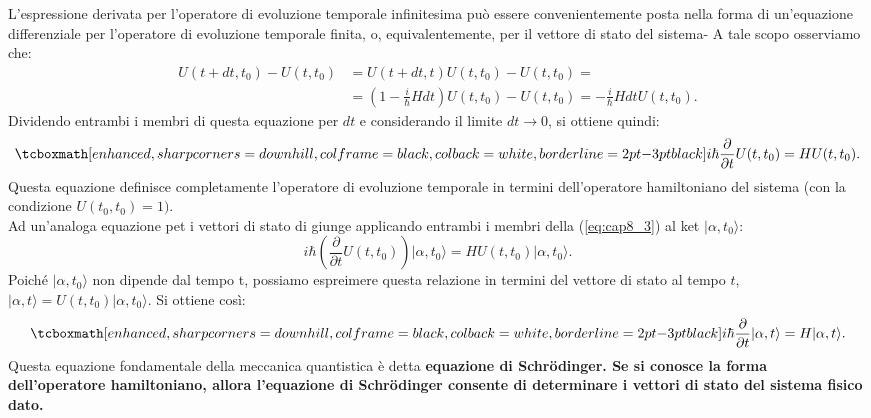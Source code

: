 L'espressione derivata per l'operatore di evoluzione temporale infinitesima può essere convenientemente posta nella forma di un'equazione differenziale per l'operatore di evoluzione temporale finita, o, equivalentemente, per il vettore di stato del sistema- A tale scopo osserviamo che:
	\begin{align}
		U(t+dt,t_0)-U(t,t_0)&=  U(t+dt,t)U(t,t_0)-U(t,t_0)= \nonumber\\
		& =\left(1-\frac{i}{\hbar}Hdt \right)U(t,t_0)-U(t,t_0)=-\frac{i}{\hbar}Hdt U(t,t_0).
	\end{align}
Dividendo entrambi i membri di questa equazione per $dt$ e considerando il limite $dt \longrightarrow 0$, si ottiene quindi:
	\begin{equation}
		\tcboxmath[enhanced, sharp corners=downhill, colframe=black, colback=white, borderline={2pt}{-3pt}{black}]{
			i\hbar \frac{\partial}{\partial t} U (t, t_0)= H U(t,t_0).
			}
	\label{eq:cap8_3}
	\end{equation}
Questa equazione definisce completamente l'operatore di evoluzione temporale in termini dell'operatore hamiltoniano del sistema (con la condizione $U(t_0,t_0)=1).$\\

Ad un'analoga equazione pet i vettori di stato di giunge applicando entrambi i membri della (\ref{eq:cap8_3}) al ket $\vert \alpha, t_0\rangle$:
	\begin{equation}
		i\hbar \left( \frac{\partial}{\partial t} U (t,t_0) \right) \vert \alpha, t_0\rangle= H U(t, t_0)\vert \alpha, t_0\rangle.
	\end{equation}
Poiché $\vert \alpha, t_0\rangle$ non dipende dal tempo t, possiamo espreimere questa relazione in termini del vettore di stato al tempo $t$, $\vert \alpha, t\rangle= U(t,t_0)\vert \alpha, t_0\rangle$. Si ottiene così:
	\begin{equation}
		\tcboxmath[enhanced, sharp corners=downhill, colframe=black, colback=white, borderline={2pt}{-3pt}{black}]{
		i\hbar \frac{\partial}{\partial t} \vert \alpha, t \rangle = H \vert \alpha, t \rangle.
		}
	\end{equation}
Questa equazione fondamentale della meccanica quantistica è detta \textbf{equazione di Schr\"{o}dinger. Se si conosce la forma dell'operatore hamiltoniano, allora l'equazione di Schr\"{o}dinger consente di determinare i vettori di stato del sistema fisico dato.}
